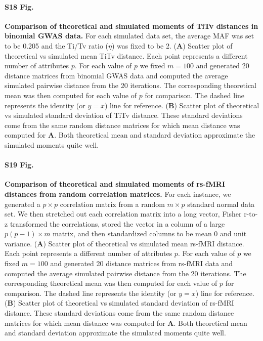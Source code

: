 \documentclass[10pt,letterpaper]{article}
\begin{document}
\paragraph*{S18 Fig.}
\label{S18_Fig}
{\bf Comparison of theoretical and simulated moments of TiTv distances in binomial GWAS data.} For each simulated data set, the average MAF was set to be 0.205 and the Ti/Tv ratio ($\eta$) was fixed to be 2. (\textbf{A}) Scatter plot of theoretical vs simulated mean TiTv distance. Each point represents a different number of attributes $p$. For each value of $p$ we fixed $m=100$ and generated 20 distance matrices from binomial GWAS data and computed the average simulated pairwise distance from the 20 iterations. The corresponding theoretical mean was then computed for each value of $p$ for comparison. The dashed line represents the identity (or $y=x$) line for reference. (\textbf{B}) Scatter plot of theoretical vs simulated standard deviation of TiTv distance. These standard deviations come from the same random distance matrices for which mean distance was computed for \textbf{A}. Both theoretical mean and standard deviation approximate the simulated moments quite well.

\paragraph*{S19 Fig.}
\label{S19_Fig}
{\bf Comparison of theoretical and simulated moments of rs-fMRI distances from random correlation matrices.} For each instance, we generated a $p \times p$ correlation matrix from a random $m \times p$ standard normal data set. We then stretched out each correlation matrix into a long vector, Fisher r-to-z transformed the correlations, stored the vector in a column of a large $p(p-1) \times m$ matrix, and then standardized columns to be mean 0 and unit variance. (\textbf{A}) Scatter plot of theoretical vs simulated mean rs-fMRI distance. Each point represents a different number of attributes $p$. For each value of $p$ we fixed $m=100$ and generated 20 distance matrices from rs-fMRI data and computed the average simulated pairwise distance from the 20 iterations. The corresponding theoretical mean was then computed for each value of $p$ for comparison. The dashed line represents the identity (or $y=x$) line for reference. (\textbf{B}) Scatter plot of theoretical vs simulated standard deviation of rs-fMRI distance. These standard deviations come from the same random distance matrices for which mean distance was computed for \textbf{A}. Both theoretical mean and standard deviation approximate the simulated moments quite well.
\end{document}

